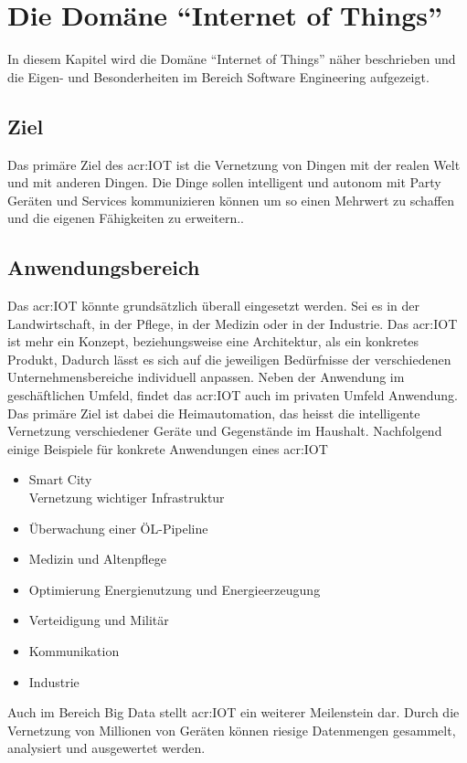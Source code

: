 \chapter{Die Domäne "`Internet of Things"'}
In diesem Kapitel wird die Domäne "`Internet of Things"' näher beschrieben und die Eigen- und Besonderheiten im Bereich Software Engineering aufgezeigt.

\section{Ziel}
Das primäre Ziel des \gls{acr:IOT} ist die Vernetzung von Dingen mit der realen Welt und mit anderen Dingen. Die Dinge sollen intelligent und autonom mit Party Geräten und Services kommunizieren können um so einen Mehrwert zu schaffen und die eigenen Fähigkeiten zu erweitern.. 

\section{Anwendungsbereich}
Das \gls{acr:IOT} könnte grundsätzlich überall eingesetzt werden. Sei es in der Landwirtschaft, in der Pflege, in der Medizin oder in der Industrie. Das \gls{acr:IOT} ist mehr ein Konzept, beziehungsweise eine Architektur, als ein konkretes Produkt, Dadurch lässt es sich auf die jeweiligen Bedürfnisse der verschiedenen Unternehmensbereiche individuell anpassen. Neben der Anwendung im geschäftlichen Umfeld, findet das \gls{acr:IOT} auch im privaten Umfeld Anwendung. Das primäre Ziel ist dabei die Heimautomation, das heisst die intelligente Vernetzung verschiedener Geräte und Gegenstände im Haushalt. Nachfolgend einige Beispiele für konkrete Anwendungen eines \gls{acr:IOT}

\begin{itemize}
\item Smart City\\
Vernetzung wichtiger Infrastruktur
\item Überwachung einer ÖL-Pipeline
\item Medizin und Altenpflege
\item Optimierung Energienutzung und Energieerzeugung
\item Verteidigung und Militär
\item Kommunikation
\item Industrie
\end{itemize}

Auch im Bereich Big Data stellt \gls{acr:IOT} ein weiterer Meilenstein dar. Durch die Vernetzung von Millionen von Geräten können riesige Datenmengen gesammelt, analysiert und ausgewertet werden.



